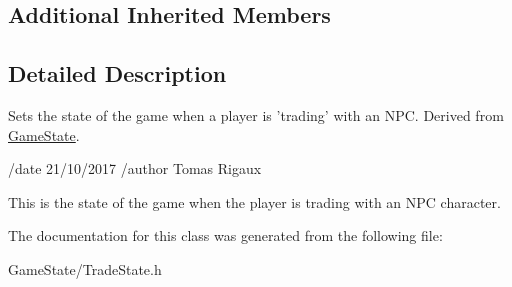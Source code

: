 \subsection*{Additional Inherited Members}


\subsection{Detailed Description}
Sets the state of the game when a player is 'trading' with an N\-P\-C. Derived from \hyperlink{classGameState}{Game\-State}. 

/date 21/10/2017 /author Tomas Rigaux

This is the state of the game when the player is trading with an N\-P\-C character. 

The documentation for this class was generated from the following file\-:\begin{DoxyCompactItemize}
\item 
Game\-State/Trade\-State.\-h\end{DoxyCompactItemize}
